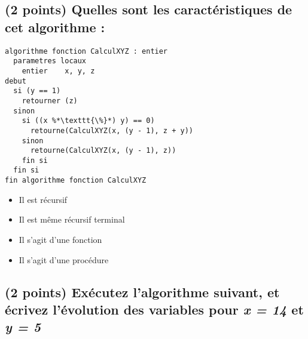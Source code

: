 \documentclass[11pt,a4paper]{article}
\begin{document}


\subsection{(2 points) Quelles sont les caractéristiques de cet algorithme : }

\bigskip

\begin{lstlisting}[style=algorithmique]
algorithme fonction CalculXYZ : entier
  parametres locaux
    entier    x, y, z
debut
  si (y == 1)
    retourner (z)
  sinon
    si ((x %*\texttt{\%}*) y) == 0)
      retourne(CalculXYZ(x, (y - 1), z + y))
    sinon
      retourne(CalculXYZ(x, (y - 1), z))
    fin si
  fin si
fin algorithme fonction CalculXYZ \end{lstlisting}

\begin{itemize}
  \item[\checkmark] Il est récursif \\ %
  \item[\checkmark] Il est même récursif terminal \\ %
  \item[\checkmark] Il s'agit d'une fonction \\ %
  \item[\CaseCoche] Il s'agit d'une procédure \\ %
\end{itemize}


\newpage
\vfillFirst


\subsection{(2 points) Exécutez l'algorithme suivant, et écrivez l'évolution des variables pour \textit{x = 14} et \textit{y = 5} }

\end{document}
